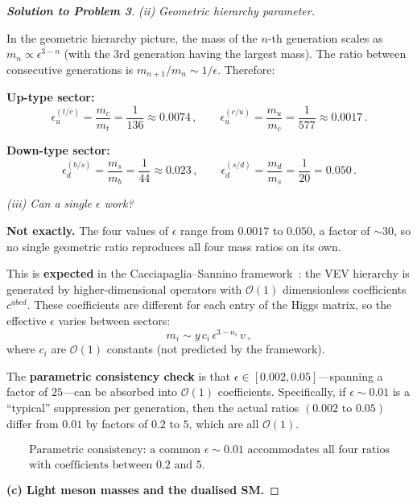\documentclass[11pt,a4paper]{article}
\begin{document}
\begin{proof}[\textbf{Solution to Problem 3}]
\textit{(ii) Geometric hierarchy parameter.}

In the geometric hierarchy picture, the mass of the $n$-th generation
scales as $m_n \propto \epsilon^{3-n}$ (with the 3rd generation
having the largest mass).  The ratio between consecutive generations is
$m_{n+1}/m_n \sim 1/\epsilon$.  Therefore:

\textbf{Up-type sector:}
\[
  \epsilon_u^{(t/c)} = \frac{m_c}{m_t}
  = \frac{1}{136} \approx 0.0074\,,
  \qquad
  \epsilon_u^{(c/u)} = \frac{m_u}{m_c}
  = \frac{1}{577} \approx 0.0017\,.
\]

\textbf{Down-type sector:}
\[
  \epsilon_d^{(b/s)} = \frac{m_s}{m_b}
  = \frac{1}{44} \approx 0.023\,,
  \qquad
  \epsilon_d^{(s/d)} = \frac{m_d}{m_s}
  = \frac{1}{20} = 0.050\,.
\]

\textit{(iii) Can a single $\epsilon$ work?}

\textbf{Not exactly.}  The four values of $\epsilon$ range from
$0.0017$ to $0.050$, a factor of $\sim 30$, so no single geometric
ratio reproduces all four mass ratios on its own.

This is \textbf{expected} in the Cacciapaglia--Sannino
framework~\cite{CacciapagliaSannino2024}: the VEV hierarchy is
generated by higher-dimensional operators with $\mathcal{O}(1)$
dimensionless coefficients $c^{abcd}$.  These coefficients are
different for each entry of the Higgs matrix, so the effective
$\epsilon$ varies between sectors:
\[
  m_i \sim y\,c_i\,\epsilon^{3-n_i}\,v\,,
\]
where $c_i$ are $\mathcal{O}(1)$ constants (not predicted by the
framework).

The \textbf{parametric consistency check} is that
$\epsilon \in [0.002, 0.05]$---spanning a factor of $25$---can be
absorbed into $\mathcal{O}(1)$ coefficients.  Specifically, if
$\epsilon \sim 0.01$ is a ``typical'' suppression per generation, then
the actual ratios $(0.002 \text{ to } 0.05)$ differ from $0.01$ by
factors of $0.2$ to $5$, which are all $\mathcal{O}(1)$.

\[
  \boxed{\begin{gathered}
  \text{Parametric consistency: a common } \epsilon \sim 0.01
  \text{ accommodates all four ratios}\\
  \text{with coefficients between } 0.2 \text{ and } 5.
  \end{gathered}}
\]

\bigskip

\textbf{(c) Light meson masses and the dualised SM.}


\end{proof}
\end{document}
